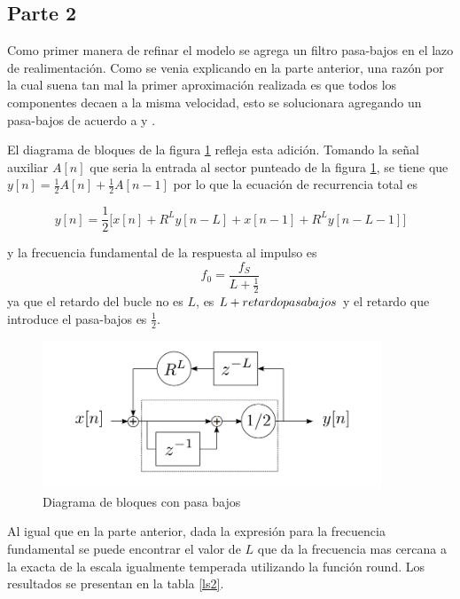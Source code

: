 \documentclass[a4paper]{article}
\begin{document}
\subsection{Parte 2}
Como primer manera de refinar el modelo se agrega un filtro pasa-bajos en el lazo de realimentación.
Como se venia explicando en la parte anterior, una razón por la cual suena tan mal la primer aproximación realizada es que todos los componentes decaen a la misma velocidad, esto se solucionara agregando un pasa-bajos de acuerdo a \cite{KS} y \cite{Steiglitz}.

\newline
El diagrama de bloques de la figura \ref{bloques2} refleja esta adición. Tomando la señal auxiliar $A[n]$ que seria la entrada al sector punteado de la figura \ref{bloques2}, se tiene que $y[n] = \frac{1}{2}A[n]+\frac{1}{2}A[n-1]$ por lo que la ecuación de recurrencia total es

$$
y[n] = \frac{1}{2} \big[x[n]+R^Ly[n-L]+x[n-1]+R^Ly[n-L-1]\big]
$$

y la frecuencia fundamental de la respuesta al impulso es 
$$
f_0 = \frac{f_S}{L+\frac{1}{2}}
$$
ya que el retardo del bucle no es $L$, es $L+retardo\-pasa\-bajos$ y el retardo que introduce el pasa-bajos es $\frac{1}{2}$.

\begin{figure}[h!]
\centering
\includegraphics[width=0.9\textwidth]{bloques.png}
\caption{Diagrama de bloques con pasa bajos \cite{of8}}
\label{bloques2}
\end{figure}

\newline
Al igual que en la parte anterior, dada la expresión para la frecuencia fundamental se puede encontrar el valor de $L$ que da la frecuencia mas cercana a la exacta de la escala igualmente temperada utilizando la función round. Los resultados se presentan en la tabla \ref{ls2}.

\begin{table}[!h]
\centering
{}
\caption{L para que la frecuencia sea la mas cercana a la deseada con filtro pasa-bajos}
\label{ls2}
\end{table}
\end{document}
